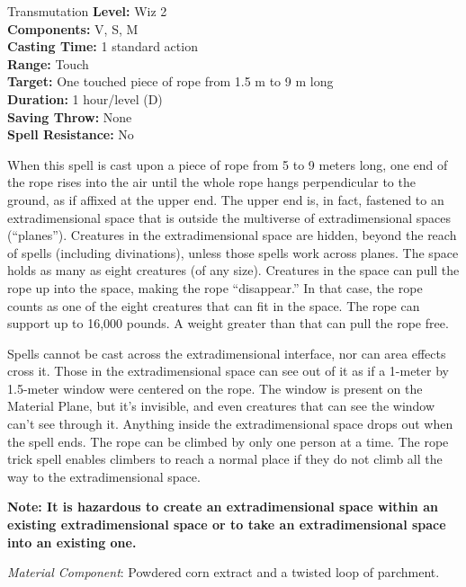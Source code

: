 {Transmutation}
{
	\textbf{Level:}
	Wiz 2\\
	\textbf{Components:}
	V, S, M\\
	\textbf{Casting Time:}
	1 standard action\\
	\textbf{Range:}
	Touch\\
	\textbf{Target:}
	One touched piece of rope from 1.5 m to 9 m long\\
	\textbf{Duration:}
	1 hour/level (D)\\
	\textbf{Saving Throw:}
	None\\
	\textbf{Spell Resistance:}
	No\\
}
{
	When this spell is cast upon a piece of rope from 5 to 9 meters long, one end of the rope rises into the air until the whole rope hangs perpendicular to the ground, as if affixed at the upper end. The upper end is, in fact, fastened to an extradimensional space that is outside the multiverse of extradimensional spaces (``planes''). Creatures in the extradimensional space are hidden, beyond the reach of spells (including divinations), unless those spells work across planes. The space holds as many as eight creatures (of any size). Creatures in the space can pull the rope up into the space, making the rope ``disappear.'' In that case, the rope counts as one of the eight creatures that can fit in the space. The rope can support up to 16,000 pounds. A weight greater than that can pull the rope free.

	Spells cannot be cast across the extradimensional interface, nor can area effects cross it. Those in the extradimensional space can see out of it as if a 1-meter by 1.5-meter window were centered on the rope. The window is present on the Material Plane, but it's invisible, and even creatures that can see the window can't see through it. Anything inside the extradimensional space drops out when the spell ends. The rope can be climbed by only one person at a time. The rope trick spell enables climbers to reach a normal place if they do not climb all the way to the extradimensional space.

	\textbf{Note: It is hazardous to create an extradimensional space within an existing extradimensional space or to take an extradimensional space into an existing one.}

	\textit{Material Component}:
	Powdered corn extract and a twisted loop of parchment.

}
